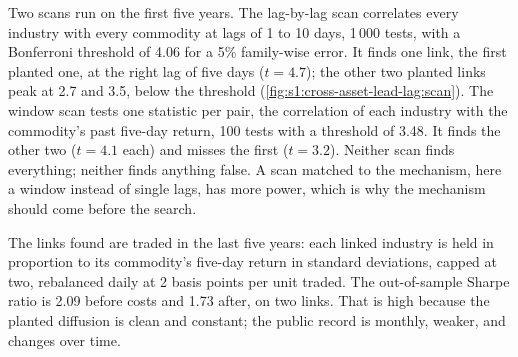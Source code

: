 Two scans run on the first five years. The lag-by-lag scan correlates every industry with every commodity at lags of 1 to 10 days, 1\,000 tests, with a
Bonferroni threshold of 4.06 for a 5\% family-wise error. It finds one link, the first planted one, at the right lag of five days ($t = 4.7$); the
other two planted links peak at 2.7 and 3.5, below the threshold (\cref{fig:s1:cross-asset-lead-lag:scan}). The window scan tests one statistic per
pair, the correlation of each industry with the commodity's past five-day return, 100 tests with a threshold of 3.48. It finds the other two ($t = 4.1$
each) and misses the first ($t = 3.2$). Neither scan finds everything; neither finds anything false. A scan matched to the mechanism, here a window
instead of single lags, has more power, which is why the mechanism should come before the search.

\begin{omfigure}

\label{fig:s1:cross-asset-lead-lag:scan}
\end{omfigure}

The links found are traded in the last five years: each linked industry is held in proportion to its commodity's five-day return in standard deviations,
capped at two, rebalanced daily at 2 basis points per unit traded. The out-of-sample Sharpe ratio is 2.09 before costs and 1.73 after, on two links. That
is high because the planted diffusion is clean and constant; the public record is monthly, weaker, and changes over time.

